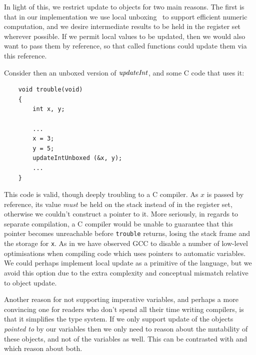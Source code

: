 In light of this, we restrict update to objects for two main reasons. The first is that in our implementation we use local unboxing~\cite{leroy:unboxing} to support efficient numeric computation, and we desire intermediate results to be held in the register set wherever possible. If we permit local values to be updated, then we would also want to pass them by reference, so that called functions could update them via this reference. 

\clearpage{}
Consider then an unboxed version of $\operatorname{\mathit{updateInt}}$, and some C code that uses it:

\begin{lstlisting}
    void trouble(void) 
    {
        int x, y;

        ...
        x = 3;
        y = 5;
        updateIntUnboxed (&x, y);
        ...
    }
\end{lstlisting}

This code is valid, though deeply troubling to a C compiler. As $x$ is passed by reference, its value \emph{must} be held on the stack instead of in the register set, otherwise we couldn't construct a pointer to it. More seriously, in regards to separate compilation, a C compiler would be unable to guarantee that this pointer becomes unreachable before \texttt{trouble} returns, losing the stack frame and the storage for \texttt{x}. As in \cite{henderson:accurate} we have observed GCC to disable a number of low-level optimisations when compiling code which uses pointers to automatic variables. We could perhaps implement local update as a primitive of the language, but we avoid this option due to the extra complexity and conceptual mismatch relative to object update.

Another reason for not supporting imperative variables, and perhaps a more convincing one for readers who don't spend all their time writing compilers, is that it simplifies the type system. If we only support update of the objects \emph{pointed to} by our variables then we only need to reason about the mutability of these objects, and not of the variables as well. This can be contrasted with \cite{odersky:less-destructive} and \cite{shapiro:origins-of-bitc} which reason about both.

